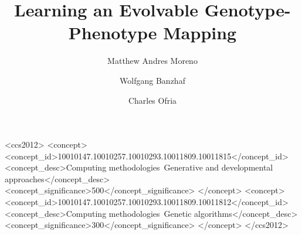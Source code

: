 \documentclass[sigconf, authordraft]{acmart}
\begin{document}
\title{Learning an Evolvable Genotype-Phenotype Mapping}

\author{Matthew Andres Moreno}

\author{Wolfgang Banzhaf}

\author{Charles Ofria}

\begin{abstract}
  
\end{abstract}

%
%
\begin{CCSXML}
<ccs2012>
<concept>
<concept_id>10010147.10010257.10010293.10011809.10011815</concept_id>
<concept_desc>Computing methodologies~Generative and developmental approaches</concept_desc>
<concept_significance>500</concept_significance>
</concept>
<concept>
<concept_id>10010147.10010257.10010293.10011809.10011812</concept_id>
<concept_desc>Computing methodologies~Genetic algorithms</concept_desc>
<concept_significance>300</concept_significance>
</concept>
</ccs2012>
\end{CCSXML}



\maketitle





\end{document}
